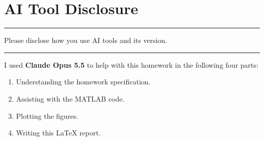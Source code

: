 \documentclass[12pt,a4paper]{report}
\newcommand{\question}[1]{%
    \hrule
    \vspace{0.2cm}
    #1
    \vspace{0.2cm}
    \hrule
    \vspace{0.5cm}
}
\begin{document}
\newpage

\chapter{AI Tool Disclosure}
\label{ch:ai}
\question{Please disclose how you use AI tools and its version.}

I used \textbf{Claude Opus 5.5} to help with this homework in the following four parts:
\begin{enumerate}[label=(\arabic*)]
    \item Understanding the homework specification.
    \item Assisting with the MATLAB code.
    \item Plotting the figures.
    \item Writing this \LaTeX{} report.
\end{enumerate}
\end{document}

